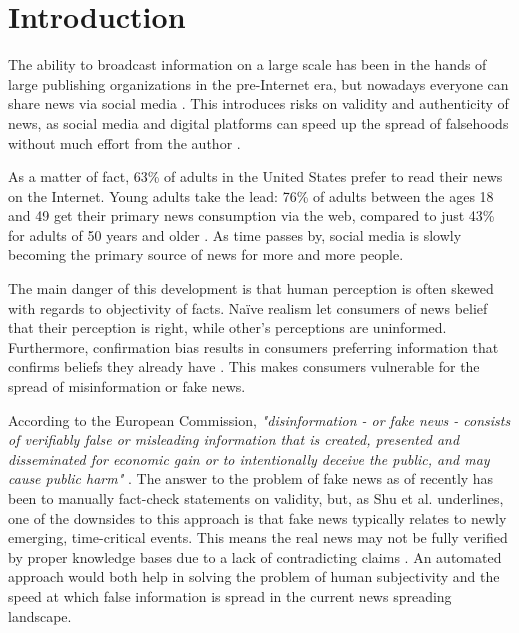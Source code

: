 \section{Introduction}
The ability to broadcast information on a large scale has been in the hands of large publishing organizations in the pre-Internet era, but nowadays everyone can share news via social media \cite{howell2013}. 
This introduces risks on validity and authenticity of news, as social media and digital platforms can speed up the spread of falsehoods without much effort from the author \cite{europeancommission2018}. 

As a matter of fact, 63\% of adults in the United States prefer to read their news on the Internet. 
Young adults take the lead: 76\% of adults between the ages 18 and 49 get their primary news consumption via the web, compared to just 43\% for adults of 50 years and older \cite{mitchell2018}.
As time passes by, social media is slowly becoming the primary source of news for more and more people. 

The main danger of this development is that human perception is often skewed with regards to objectivity of facts. 
Naïve realism let consumers of news belief that their perception is right, while other's perceptions are uninformed. 
Furthermore, confirmation bias results in consumers preferring information that confirms beliefs they already have \cite{shu2017}. 
This makes consumers vulnerable for the spread of misinformation or fake news. 

According to the European Commission, \textit{"disinformation - or fake news - consists of verifiably false or misleading information that is created, presented and disseminated for economic gain or to intentionally deceive the public, and may cause public harm"} \cite{europeancommission2018}. 
The answer to the problem of fake news as of recently has been to manually fact-check statements on validity, but, as Shu et al. underlines, one of the downsides to this approach is that fake news typically relates to newly emerging, time-critical events. 
This means the real news may not be fully verified by proper knowledge bases due to a lack of contradicting claims \cite{shu2017}. 
An automated approach would both help in solving the problem of human subjectivity and the speed at which false information is spread in the current news spreading landscape. 

